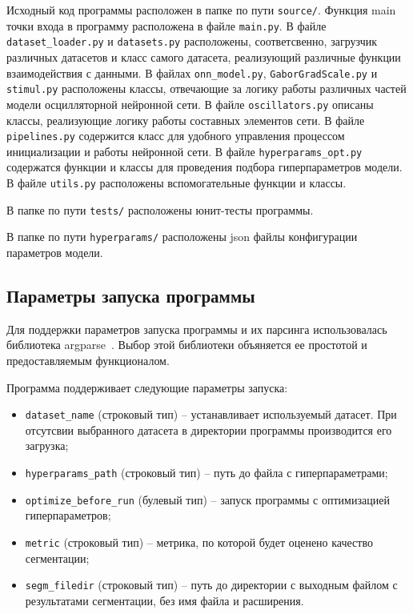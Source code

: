 \documentclass[14pt, russian]{scrartcl}
\begin{document}
Исходный код программы расположен в папке по пути \texttt{source/}. Функция main точки входа в программу расположена в файле \texttt{main.py}. В файле \texttt{dataset\_loader.py} 
и \texttt{datasets.py} расположены, соответсвенно, загрузчик различных датасетов и класс самого датасета, реализующий различные функции взаимодействия с данными.
В файлах \texttt{onn\_model.py}, \texttt{GaborGradScale.py} и \texttt{stimul.py} расположены классы, отвечающие за логику работы различных частей модели осцилляторной нейронной сети.
В файле \texttt{oscillators.py} описаны классы, реализующие логику работы составных элементов сети. В файле \texttt{pipelines.py} содержится класс для удобного управления процессом инициализации и работы нейронной сети.
В файле \texttt{hyperparams\_opt.py} содержатся функции и классы для проведения подбора гиперпараметров модели. В файле \texttt{utils.py} расположены вспомогательные функции и классы.

В папке по пути \texttt{tests/} расположены юнит-тесты программы.

В папке по пути \texttt{hyperparams/} расположены json файлы конфигурации параметров модели. 

\subsection{Параметры запуска программы}

Для поддержки параметров запуска программы и их парсинга использовалась библиотека argparse~\cite{1}. Выбор этой библиотеки объяняется ее простотой и предоставляемым функционалом.

Программа поддерживает следующие параметры запуска:

\begin{itemize}
    \item \texttt{dataset\_name} (строковый тип) -- устанавливает используемый датасет. При отсутсвии выбранного датасета в директории программы производится его загрузка;
    \item \texttt{hyperparams\_path} (строковый тип) -- путь до файла с гиперпараметрами;
    \item \texttt{optimize\_before\_run} (булевый тип) -- запуск программы с оптимизацией гиперпараметров;
    \item \texttt{metric} (строковый тип) -- метрика, по которой будет оценено качество сегментации;
    \item \texttt{segm\_filedir} (строковый тип) -- путь до директории с выходным файлом с результатами сегментации, без имя файла и расширения.
\end{itemize}
\end{document}
